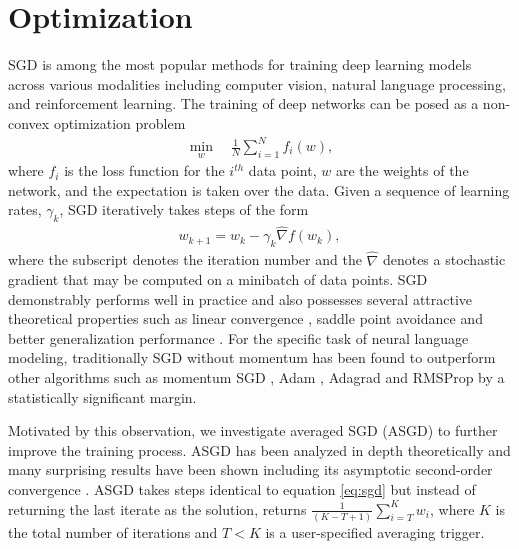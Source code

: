 \documentclass{article}
\begin{document}
\section{Optimization}
SGD is among the most popular methods for training deep learning models across various modalities including computer vision, natural language processing, and reinforcement learning. The training of deep networks can be posed as a non-convex optimization problem
\begin{align*}
\min_w \quad \frac{1}{N} \sum_{i=1}^N f_i(w),
\end{align*}
where $f_i$ is the loss function for the $i^{th}$ data point, $w$ are the weights of the network, and the expectation is taken over the data. Given a sequence of learning rates, $\gamma_k$, SGD iteratively takes steps of the form 
\begin{align}
w_{k+1} = w_k - \gamma_k \hat{\nabla} f(w_k), \label{eq:sgd}
\end{align}
where the subscript denotes the iteration number and the $\hat{\nabla}$ denotes a stochastic gradient that may be computed on a minibatch of data points. SGD demonstrably performs well in practice and also possesses several attractive theoretical properties such as linear convergence \cite{bottou2016optimization}, saddle point avoidance \cite{panageas2016gradient} and better generalization performance \cite{hardt2015train}.
For the specific task of neural language modeling, traditionally SGD without momentum has been found to outperform other algorithms such as momentum SGD \cite{sutskever2013importance}, Adam \cite{kingma2014adam}, Adagrad \cite{duchi2011adaptive} and RMSProp \cite{tieleman2012lecture} by a statistically significant margin.

Motivated by this observation, we investigate averaged SGD (ASGD) to further improve the training process. ASGD has been analyzed in depth theoretically and many surprising results have been shown including its asymptotic second-order convergence \cite{polyak1992acceleration,mandt2017stochastic}. ASGD takes steps identical to equation \eqref{eq:sgd} but instead of returning the last iterate as the solution, returns $\frac{1}{(K-T+1)} \sum_{i=T}^K w_i$, where $K$ is the total number of iterations and $T<K$ is a user-specified averaging trigger. 
\end{document}
